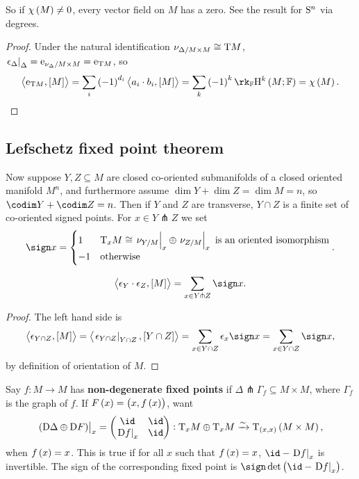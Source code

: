 So if $ \chi\br{M} \ne 0 $, every vector field on $ M $ has a zero. See the result for $ \S^n $ via degrees.

\begin{proof}
Under the natural identification $ \nu_{\Delta / M \times M} \cong \T M $, $ \eval{\epsilon_\Delta}_\Delta = \e_{\nu_\Delta / M \times M} = \e_{\T M} $, so
$$ \abr{\e_{\T M}, \sbr{M}} = \sum_i \br{-1}^{d_i}\abr{a_i \cdot b_i, \sbr{M}} = \sum_k \br{-1}^k \rk_\FF\H^k\br{M; \FF} = \chi\br{M}. $$
\end{proof}

\subsection{Lefschetz fixed point theorem}

Now suppose $ Y, Z \subseteq M $ are closed co-oriented submanifolds of a closed oriented manifold $ M^n $, and furthermore assume $ \dim Y + \dim Z = \dim M = n $, so $ \codim Y + \codim Z = n $. Then if $ Y $ and $ Z $ are transverse, $ Y \cap Z $ is a finite set of co-oriented signed points. For $ x \in Y \pitchfork Z $ we set
$$ \sign x =
\begin{cases}
1 & \T_xM \cong \eval{\nu_{Y / M}}_x \oplus \eval{\nu_{Z / M}}_x \ \text{is an oriented isomorphism} \\
-1 & \text{otherwise}
\end{cases}.
$$

\begin{lemma}
$$ \abr{\epsilon_Y \cdot \epsilon_Z, \sbr{M}} = \sum_{x \in Y \pitchfork Z} \sign x. $$
\end{lemma}

\begin{proof}
The left hand side is
$$ \abr{\epsilon_{Y \cap Z}, \sbr{M}} = \abr{\eval{\epsilon_{Y \cap Z}}_{Y \cap Z}, \sbr{Y \cap Z}} = \sum_{x \in Y \cap Z} \epsilon_x\sign x = \sum_{x \in Y \cap Z} \sign x, $$
by definition of orientation of $ M $.
\end{proof}

Say $ f : M \to M $ has \textbf{non-degenerate fixed points} if $ \Delta \pitchfork \Gamma_f \subseteq M \times M $, where $ \Gamma_f $ is the graph of $ f $. If $ F\br{x} = \br{x, f\br{x}} $, want
$$ \eval{\br{\D\Delta \oplus \D F}}_x = \twobytwo{\id}{\id}{\eval{\D f}_x}{\id} : \T_xM \oplus \T_xM \xrightarrow{\sim} \T_{\br{x, x}}\br{M \times M}, $$
when $ f\br{x} = x $. This is true if for all $ x $ such that $ f\br{x} = x $, $ \id - \eval{\D f}_x $ is invertible. The sign of the corresponding fixed point is $ \sign \det \br{\id - \eval{\D f}_x} $.

